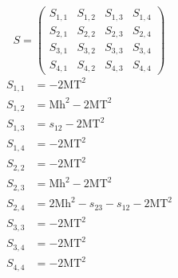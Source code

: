 \documentclass[a4paper]{article}
\begin{document}
\begin{equation}
S=\left(\begin{array}{cccc}
   S_{1,1}&
   S_{1,2}&
   S_{1,3}&
   S_{1,4}\\
   S_{2,1}&
   S_{2,2}&
   S_{2,3}&
   S_{2,4}\\
   S_{3,1}&
   S_{3,2}&
   S_{3,3}&
   S_{3,4}\\
   S_{4,1}&
   S_{4,2}&
   S_{4,3}&
   S_{4,4}\end{array}\right)
\end{equation}
\begin{subequations}
\begin{align}
   S_{1,1}&=-2\text{MT}^2\\
   S_{1,2}&=\text{Mh}^2-2\text{MT}^2\\
   S_{1,3}&=s_{12}-2\text{MT}^2\\
   S_{1,4}&=-2\text{MT}^2\\
   S_{2,2}&=-2\text{MT}^2\\
   S_{2,3}&=\text{Mh}^2-2\text{MT}^2\\
   S_{2,4}&=2\text{Mh}^2-s_{23}-s_{12}-2\text{MT}^2\\
   S_{3,3}&=-2\text{MT}^2\\
   S_{3,4}&=-2\text{MT}^2\\
   S_{4,4}&=-2\text{MT}^2
\end{align}
\end{subequations}
\end{document}
